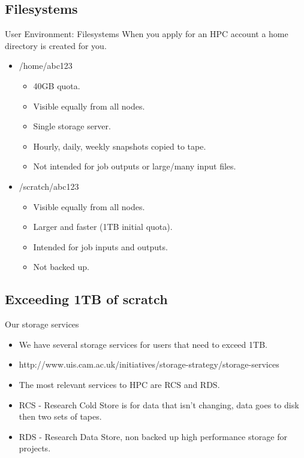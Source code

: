 \subsection{Filesystems}
\begin{frame}{User Environment: Filesystems}
When you apply for an HPC account a home directory is created for you. 
\begin{itemize}
\item{\alert{/home/abc123}}
\begin{itemize}
\item{40GB quota.}
\item{Visible equally from all nodes.}
\item{Single storage server.}
\item{Hourly, daily, weekly snapshots copied to tape.}
\item{Not intended for job outputs or large/many input files.}
\end{itemize}
\item{\alert{/scratch/abc123}}
\begin{itemize}
\item{Visible equally from all nodes.}
\item{Larger and faster (1TB initial quota).}
\item{Intended for job inputs and outputs.}
\item{{\color{red}Not backed up.}}
 \pause
\end{itemize}
\end{itemize}
\end{frame}

\subsection{Exceeding 1TB of scratch}
\begin{frame}{Our storage services}
\begin{itemize}
\item{We have several storage services for users that need to exceed 1TB.}
\pause
\item{\alert{http://www.uis.cam.ac.uk/initiatives/storage-strategy/storage-services}}
\item{The most relevant services to HPC are RCS and RDS.}
\item{RCS - Research Cold Store is for data that isn't changing, data goes to disk then two sets of tapes.}
\item{RDS - Research Data Store, non backed up high performance storage for projects.}
\end{itemize}
\end{frame}

